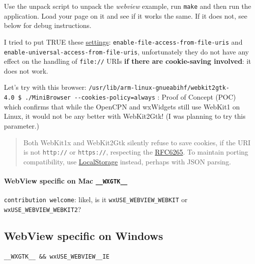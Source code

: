 \documentclass[11pt]{article}
\begin{document}
Use the unpack script to unpack the \emph{webview} example, run
\texttt{make} and then run the application. Load your page on it and see
if it works the same. If it does not, see below for debug instructions.

    I tried to put TRUE these
\href{https://webkitgtk.org/reference/webkitgtk/2.4.10/webkitgtk-webkitwebview.html}{settings}:
\texttt{enable-file-access-from-file-uris} and
\texttt{enable-universal-access-from-file-uris}, unfortunately they do
not have any effect on the handling of \texttt{file://} URIs \textbf{if
there are cookie-saving involved}: it does not work.

    Let's try with this browser:
\texttt{/usr/lib/arm-linux-gnueabihf/webkit2gtk-4.0\ \$\ ./MiniBrowser\ -\/-cookies-policy=always}
: Proof of Concept (POC) which confirms that while the OpenCPN and
wxWidgets still use WebKit1 on Linux, it would not be any better with
WebKit2Gtk! (I was planning to try this parameter.)

    \begin{quote}
Both WebKit1x and WebKit2Gtk silently refuse to save cookies, if the URI
is not \texttt{http://} or \texttt{https://}, respecting the
\href{https://tools.ietf.org/html/rfc6265}{RFC6265}. To maintain porting
compatibility, use
\href{https://developer.mozilla.org/en-US/docs/Web/API/Window/localStorage}{LocalStorage}
instead, perhaps with JSON parsing.
\end{quote}

    \hypertarget{webview-specific-on-mac-__wxgtk__}{%
\paragraph{\texorpdfstring{WebView specific on Mac
\texttt{\_\_WXGTK\_\_}}{WebView specific on Mac \_\_WXGTK\_\_}}\label{webview-specific-on-mac-__wxgtk__}}

    \texttt{contribution\ welcome}: likel, is it
\texttt{wxUSE\_WEBVIEW\_WEBKIT} or \texttt{wxUSE\_WEBVIEW\_WEBKIT2}?

    \hypertarget{webview-specific-on-windows}{%
\subsection{WebView specific on
Windows}\label{webview-specific-on-windows}}

    \begin{verbatim}
__WXGTK__ && wxUSE_WEBVIEW__IE
\end{verbatim}
\end{document}
